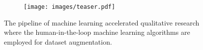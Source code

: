 
\begin{figure}[!tbp]
	\centering
    \begin{subfigure}{0.47\textwidth}
		\texttt{[image: images/teaser.pdf]}
	\end{subfigure}
	\caption{
        The pipeline of machine learning accelerated qualitative research where the human-in-the-loop machine learning algorithms are employed for dataset augmentation.
	}
	\label{fig:teaser}
\end{figure}
